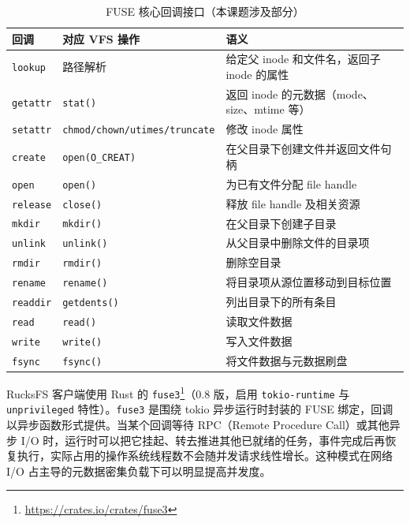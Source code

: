 \begin{table}[htbp]
    \centering
    \caption{FUSE 核心回调接口（本课题涉及部分）}
    \label{tab:fuse_callbacks}
    \small
    \begin{tabular}{llp{6.5cm}}
    \toprule
    \textbf{回调} & \textbf{对应 VFS 操作} & \textbf{语义} \\
    \midrule
    \texttt{lookup}   & 路径解析 & 给定父 inode 和文件名，返回子 inode 的属性 \\
    \texttt{getattr}  & \texttt{stat()} & 返回 inode 的元数据（mode、size、mtime 等） \\
    \texttt{setattr}  & \texttt{chmod/chown/utimes/truncate} & 修改 inode 属性 \\
    \texttt{create}   & \texttt{open(O\_CREAT)} & 在父目录下创建文件并返回文件句柄 \\
    \texttt{open}     & \texttt{open()} & 为已有文件分配 file handle \\
    \texttt{release}  & \texttt{close()} & 释放 file handle 及相关资源 \\
    \texttt{mkdir}    & \texttt{mkdir()} & 在父目录下创建子目录 \\
    \texttt{unlink}   & \texttt{unlink()} & 从父目录中删除文件的目录项 \\
    \texttt{rmdir}    & \texttt{rmdir()} & 删除空目录 \\
    \texttt{rename}   & \texttt{rename()} & 将目录项从源位置移动到目标位置 \\
    \texttt{readdir}  & \texttt{getdents()} & 列出目录下的所有条目 \\
    \texttt{read}     & \texttt{read()} & 读取文件数据 \\
    \texttt{write}    & \texttt{write()} & 写入文件数据 \\
    \texttt{fsync}    & \texttt{fsync()} & 将文件数据与元数据刷盘 \\
    \bottomrule
    \end{tabular}
\end{table}

RucksFS 客户端使用 Rust 的 \texttt{fuse3}\footnote{\url{https://crates.io/crates/fuse3}}（0.8 版，启用 \texttt{tokio-runtime} 与 \texttt{unprivileged} 特性）。\texttt{fuse3} 是围绕 tokio 异步运行时封装的 FUSE 绑定，回调以异步函数形式提供。当某个回调等待 RPC（Remote Procedure Call）或其他异步 I/O 时，运行时可以把它挂起、转去推进其他已就绪的任务，事件完成后再恢复执行，实际占用的操作系统线程数不会随并发请求线性增长。这种模式在网络 I/O 占主导的元数据密集负载下可以明显提高并发度。

